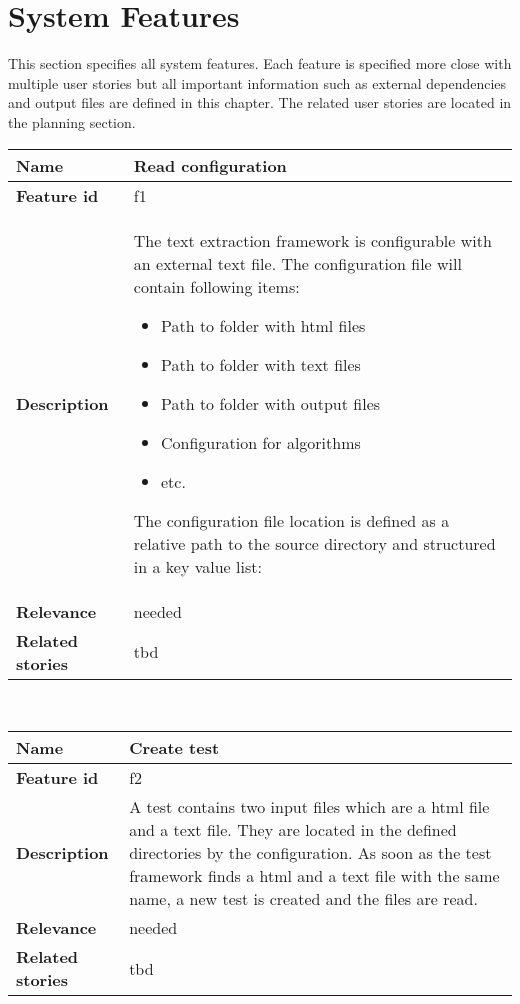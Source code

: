 \section{System Features}

This section specifies all system features. Each feature is specified more close with multiple user stories but all important information such as external dependencies and output files are defined in this chapter. The related user stories are located in the planning section.  

	\begin{tabular}{ | p{3cm} | p{12cm} |}
	\hline
	\textbf{Name} 				& Read configuration 				\\ \hline
	\textbf{Feature id} 		& f1 				\\ \hline
	\textbf{Description} 		& The text extraction framework is configurable with an external text file. The configuration file will contain following items:
							        \begin{itemize}
							        \item Path to folder with html files
							        \item Path to folder with text files
							        \item Path to folder with output files
							        \item Configuration for algorithms
							        \item etc.
						        \end{itemize} 
						        The configuration file location is defined as a relative path to the source directory and structured in a key value list: 

						         \\ \hline
	\textbf{Relevance} 			& needed 			\\ \hline
	\textbf{Related stories} 	& tbd		\\ \hline
	\end{tabular} \\

	\begin{tabular}{ | p{3cm} | p{12cm} |}
	\hline
	\textbf{Name} 				& Create test \\ \hline
	\textbf{Feature id} 		& f2 \\ \hline
	\textbf{Description} 		& A test contains two input files which are a html file and a text file. They are located in the defined directories by the configuration. As soon as the test framework finds a html and a text file with the same name, a new test is created and the files are read.\\ \hline
	\textbf{Relevance} 			& needed \\ \hline
	\textbf{Related stories} 	& tbd \\ \hline
	\end{tabular} \\

